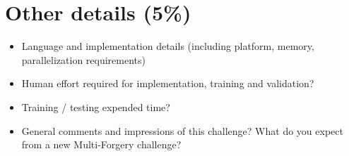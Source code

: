 \documentclass{article}
\begin{document}
\section{Other details (5\%)}

\begin{itemize}
\item Language and implementation details (including platform, memory, parallelization requirements)
\item Human effort required for implementation, training and validation?
\item Training / testing expended time?
\item General comments and impressions of this challenge? What do you expect from a new Multi-Forgery challenge?
\end{itemize}
\end{document}
